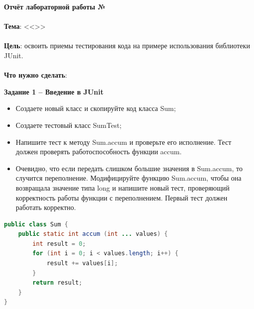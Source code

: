 \documentclass[12pt, a4paper, simple]{eskdtext}
\def \gpiDocTopic {Отчёт лабораторной работы №\gpiDocNum}
\begin{document}
    
    \begin{center}
        \textbf{\gpiDocTopic}
    \end{center}

    \paragraph{} \textbf{Тема}: <<\gpiTopicRep>>

    \paragraph{} \textbf{Цель}:
    освоить приемы тестирования кода на примере использования библиотеки JUnit.



    \paragraph{} \textbf{Что нужно сделать}:

    \textbf{Задание 1 – Введение в JUnit}

\begin{itemize}
    \item Создаете новый класс и скопируйте код класса Sum;
    \item Создаете тестовый класс SumTest;
    \item Напишите тест к методу Sum.accum и проверьте его исполнение.
    Тест должен проверять работоспособность функции accum.
    \item Очевидно, что если передать слишком большие значения в Sum.accum, то случится переполнение.
    Модифицируйте функцию Sum.accum, чтобы она возвращала значение типа long и напишите новый тест,
    проверяющий корректность работы функции с переполнением.
    Первый тест должен работать корректно.
\end{itemize}

    \begin{lstlisting}[language=java, name=Пример кода для задания 1]
public class Sum {
    public static int accum (int ... values) {
        int result = 0;
        for (int i = 0; i < values.length; i++) {
            result += values[i];
        }
        return result;
    }
}
\end{lstlisting}
    
\end{document}

